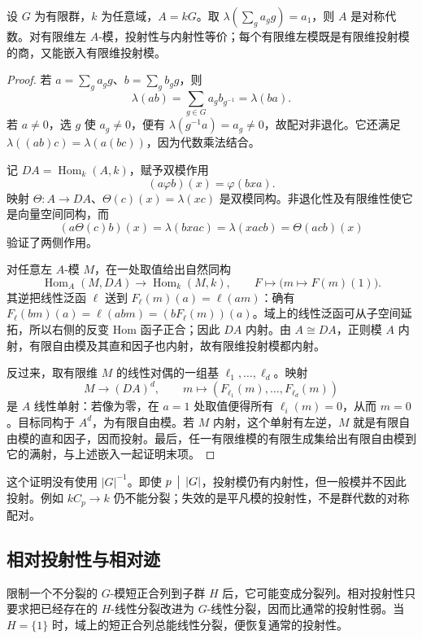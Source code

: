 \begin{proposition}\label{b5:prop:group-algebra-symmetric}
	设 \(G\) 为有限群，\(k\) 为任意域，\(A=kG\)。取 \(\lambda(\sum_g a_gg)=a_1\)，则 \(A\) 是对称代数。对有限维左 \(A\)-模，投射性与内射性等价；每个有限维左模既是有限维投射模的商，又能嵌入有限维投射模。
\end{proposition}
\begin{proof}
	若 \(a=\sum_ga_gg\)、\(b=\sum_gb_gg\)，则
	\[
		\lambda(ab)=\sum_{g\in G}a_gb_{g^{-1}}=\lambda(ba).
	\]
	若 \(a\ne0\)，选 \(g\) 使 \(a_g\ne0\)，便有 \(\lambda(g^{-1}a)=a_g\ne0\)，故配对非退化。它还满足 \(\lambda((ab)c)=\lambda(a(bc))\)，因为代数乘法结合。

	记 \(DA=\operatorname{Hom}_k(A,k)\)，赋予双模作用
	\[
		(a\varphi b)(x)=\varphi(bxa).
	\]
	映射 \(\Theta:A\to DA\)、\(\Theta(c)(x)=\lambda(xc)\) 是双模同构。非退化性及有限维性使它是向量空间同构，而
	\[
		(a\Theta(c)b)(x)=\lambda(bxac)=\lambda(xacb)=\Theta(acb)(x)
	\]
	验证了两侧作用。

	对任意左 \(A\)-模 \(M\)，在一处取值给出自然同构
	\[
		\operatorname{Hom}_A(M,DA)\longrightarrow\operatorname{Hom}_k(M,k),
		\qquad F\longmapsto\bigl(m\mapsto F(m)(1)\bigr).
	\]
	其逆把线性泛函 \(\ell\) 送到 \(F_\ell(m)(a)=\ell(am)\)：确有 \(F_\ell(bm)(a)=\ell(abm)=(bF_\ell(m))(a)\)。域上的线性泛函可从子空间延拓，所以右侧的反变 Hom 函子正合；因此 \(DA\) 内射。由 \(A\cong DA\)，正则模 \(A\) 内射，有限自由模及其直和因子也内射，故有限维投射模都内射。

	反过来，取有限维 \(M\) 的线性对偶的一组基 \(\ell_1,\ldots,\ell_d\)。映射
	\[
		M\longrightarrow(DA)^d,\qquad m\longmapsto(F_{\ell_1}(m),\ldots,F_{\ell_d}(m))
	\]
	是 \(A\) 线性单射：若像为零，在 \(a=1\) 处取值便得所有 \(\ell_i(m)=0\)，从而 \(m=0\)。目标同构于 \(A^d\)，为有限自由模。若 \(M\) 内射，这个单射有左逆，\(M\) 就是有限自由模的直和因子，因而投射。最后，任一有限维模的有限生成集给出有限自由模到它的满射，与上述嵌入一起证明末项。
\end{proof}

这个证明没有使用 \(|G|^{-1}\)。即使 \(p\,\bigm\vert\,|G|\)，投射模仍有内射性，但一般模并不因此投射。例如 \(kC_p\to k\) 仍不能分裂；失效的是平凡模的投射性，不是群代数的对称配对。

\subsection{相对投射性与相对迹}
\label{b5:subsec:0805:02}

限制一个不分裂的 \(G\)-模短正合列到子群 \(H\) 后，它可能变成分裂列。相对投射性只要求把已经存在的 \(H\)-线性分裂改进为 \(G\)-线性分裂，因而比通常的投射性弱。当 \(H=\{1\}\) 时，域上的短正合列总能线性分裂，便恢复通常的投射性。

